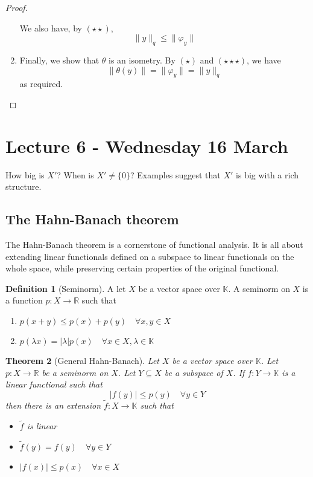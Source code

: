 \documentclass[10pt, oneside, reqno]{amsart}
\theoremstyle{plain}%
\newtheorem{thm}{Theorem}[section]
\theoremstyle{definition}
\newtheorem{defn}[thm]{Definition}
\theoremstyle{remark}
\newcommand{\R}{\mathbb{R}}
\newcommand{\K}{\mathbb{K}}
\renewcommand{\phi}{\varphi}
\begin{document}
\begin{proof}
\begin{enumerate}[(1)]
		We also have, by $(\star \star)$,\[
			\| y \|_q \leq \| \phi_y \|
		\] 
		\item Finally, we show that $\theta$ is an isometry.  By $(\star)$ and $(\star \star \star)$, we have \[
			\| \theta(y) \| = \| \phi_y \| = \| y \|_q 
		\] as required.\qedhere
		 
	\end{enumerate} 
\end{proof}	

\section{Lecture 6 - Wednesday 16 March} %
\label{sec:lecture_6_wednesday_16_march}
How big is $X'$?  When is $X' \neq \{ 0 \}$?  Examples suggest that $X'$ is big with a rich structure.  

\subsection{The Hahn-Banach theorem} %
\label{sub:the_hahn_banach_theorem}
The Hahn-Banach theorem is a cornerstone of functional analysis.  It is all about extending linear functionals defined on a subspace to linear functionals on the whole space, while preserving certain properties of the original functional.

\begin{defn}[Seminorm]
A let $X$ be a vector space over $\K$.  A seminorm on $X$ is a function $p : X \rightarrow \R$ such that 
\begin{enumerate}[(1)]
	\item $p(x+y) \leq p(x) + p(y) \quad \forall x,y \in X$
	\item $p(\lambda x) = | \lambda | p(x) \quad \forall x \in X, \lambda \in \K$
\end{enumerate}
\end{defn}

\begin{thm}[General Hahn-Banach]
	Let $X$ be a vector space over $\K$.  Let $p: X \rightarrow \R$ be a seminorm on $X$.  Let $Y \subseteq X$ be a subspace of $X$.  If $f : Y \rightarrow \K$ is a linear functional such that \[
		| f(y) | \leq p(y) \quad \forall y \in Y
	\] then there is an extension $\tilde{f} : X \rightarrow \K$ such that 
	\begin{itemize}
		\item $\tilde{f}$ is linear
		\item $\tilde f (y) = f(y) \quad \forall y \in Y$
		\item $|f(x)| \leq p(x) \quad \forall x \in X$
	\end{itemize}
\end{thm}
\end{document}
